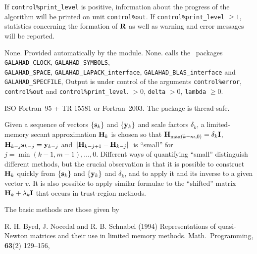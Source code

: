 \documentclass{galahad}
\newcommand{\packagename}{LMS}
\begin{document}

\galinfo
If {\tt control\%print\_level} is positive, information about the progress
of the algorithm will be printed on unit {\tt control\-\%out}.
If {\tt control\%print\_level} $\geq 1$, statistics concerning the
formation of ${\mathbf{R}}$
as well as warning and error messages will be reported.


\galgeneral

\galcommon None.
\galworkspace Provided automatically by the module.
\galroutines None.
\galmodules {\tt \packagename} calls the \galahad\ packages
{\tt GALAHAD\_CLOCK},
{\tt GALAHAD\_SY\-M\-BOLS}, \\
{\tt GALAHAD\-\_SPACE},
{\tt GALAHAD\_LAPACK\_interface},
{\tt GALAHAD\_BLAS\_interface} and
{\tt GALAHAD\_SPECFILE},
\galio Output is under control of the arguments
 {\tt control\%error}, {\tt control\%out} and {\tt control\%print\_level}.
 $> 0$, {\tt delta} $> 0$, {\tt lambda} $\geq 0$.

\galportability ISO Fortran~95 + TR 15581 or Fortran~2003.
The package is thread-safe.



\galmethod

Given a sequence of vectors $\{{\mathbf{s}}_k\}$ and $\{{\mathbf{y}}_k\}$ and scale factors
$\delta_k$, a limited-memory secant approximation ${\mathbf{H}}_k$ is chosen so that
${\mathbf{H}}_{\max(k-m,0)} = \delta_k {\mathbf{I}}$, ${\mathbf{H}}_{k-j} {\mathbf{s}}_{k-j} = {\mathbf{y}}_{k-j}$
and $\| {\mathbf{H}}_{k-j+1} - {\mathbf{H}}_{k-j}\|$ is ``small'' for
$j = \min(k-1,m-1), \ldots, 0$.
Different ways of quantifying ``small'' distinguish different methods,
but the crucial
observation is that it is possible to construct ${\mathbf{H}}_k$ quickly from
$\{{\mathbf{s}}_k\}$ and $\{{\mathbf{y}}_k\}$ and $\delta_k$, and to apply it and its inverse
to a given vector $v$. It is also possible to apply similar formulae
to the ``shifted'' matrix ${\mathbf{H}}_k + \lambda_k {\mathbf{I}}$ that occurs in
trust-region methods.

\noindent
The basic methods are those given by
\vspace*{1mm}

\noindent
R. H. Byrd, J. Nocedal and R. B. Schnabel (1994)
Representations of quasi-Newton matrices and their use in
limited memory methods.
Math.\ Programming,  {\bf 63}(2) 129--156,
\vspace*{1mm}
\end{document}
